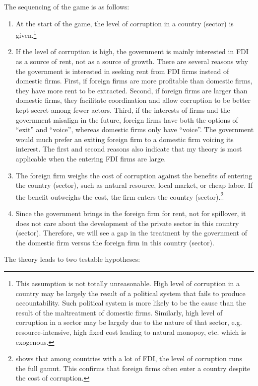 The sequencing of the game is as follows:
\begin{enumerate}
\item At the start of the game, the level of corruption in a country (sector) is given.\footnote{This assumption is not totally unreasonable. High level of corruption in a country may be largely the result of a political system that fails to produce accountability. Such political system is more likely to be the cause than the result of the maltreatment of domestic firms. Similarly, high level of corruption in a sector may be largely due to the nature of that sector, e.g. resource-intensive, high fixed cost leading to natural monopoy, etc. which is exogenous.}
\item  If the level of corruption is high, the government is mainly interested in FDI as a source of rent, not as a source of growth. There are several reasons why the government is interested in seeking rent from FDI firms instead of domestic firms. First, if foreign firms are more profitable than domestic firms, they have more rent to be extracted. Second, if foreign firms are larger than domestic firms, they facilitate coordination and allow corruption to be better kept secret among fewer actors. Third, if the interests of firms and the government misalign in the future, foreign firms have both the options of ``exit'' and ``voice'', whereas domestic firms only have ``voice''. The government would much prefer an exiting foreign firm to a domestic firm voicing its interest. The first and second reasons also indicate that my theory is most applicable when the entering FDI firms are large.
\item The foreign firm weighs the cost of corruption against the benefits of entering the country (sector), such as natural resource, local market, or cheap labor. If the benefit outweighs the cost, the firm enters the country (sector).\footnote{ shows that among countries with a lot of FDI, the level of corruption runs the full gamut. This confirms that foreign firms often enter a country despite the cost of corruption.}
\item Since the government brings in the foreign firm for rent, not for spillover, it does not care about the development of the private sector in this country (sector). Therefore, we will see a gap in the treatment by the government of the domestic firm versus the foreign firm in this country (sector).
\end{enumerate}

The theory leads to two testable hypotheses:

